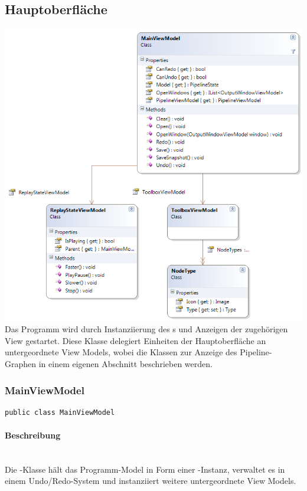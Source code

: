 \subsection{Hauptoberfläche}

\includegraphics[width=\textwidth]{YuvKA.ViewModel/main.png}
Das Programm wird durch Instanziierung des s und Anzeigen der zugehörigen View gestartet. Diese Klasse delegiert Einheiten der Hauptoberfläche an untergeordnete View Models, wobei die Klassen zur Anzeige des Pipeline-Graphen in einem eigenen Abschnitt beschrieben werden.

\subsubsection{MainViewModel}

\begin{verbatim}
public class MainViewModel
\end{verbatim}

\paragraph{Beschreibung}~\\
Die -Klasse hält das Programm-Model in Form einer -Instanz, verwaltet es in einem Undo/Redo-System und instanziiert weitere untergeordnete View Models.

